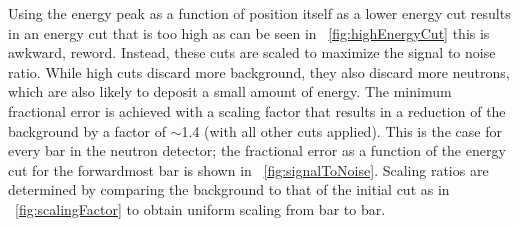Using the energy peak as a function of position itself as a lower energy cut results in an energy cut that is too high as can be seen in {\fig}~\ref{fig:highEnergyCut} {this is awkward, reword}.  Instead, these cuts are scaled to maximize the signal to noise ratio.  While high cuts discard more background, they also discard more neutrons, which are also likely to deposit a small amount of energy.  The minimum fractional error is achieved with a scaling factor that results in a reduction of the background by a factor of $\sim$1.4 (with all other cuts applied).  This is the case for every bar in the neutron detector; the fractional error as a function of the energy cut for the forwardmost bar is shown in {\fig}~\ref{fig:signalToNoise}.  Scaling ratios are determined by comparing the background to that of the initial cut as in {\fig}~\ref{fig:scalingFactor} to obtain uniform scaling from bar to bar.  
\begin{figure}[!htbp]
\centering
{}
\hspace{8pt}
\caption{}
\label{fig:scalingFactorEffect}
\end{figure}
